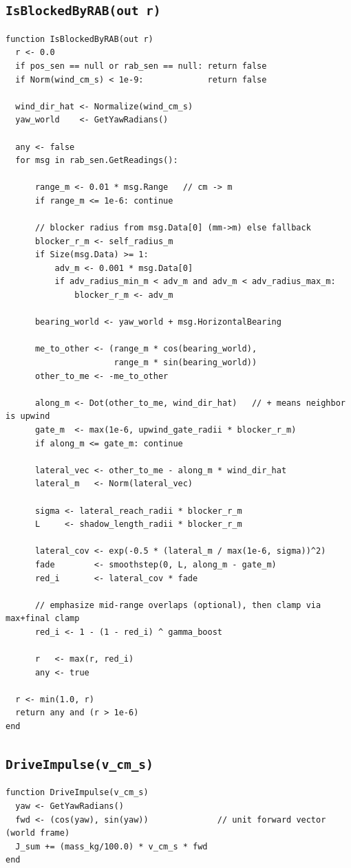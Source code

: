 \documentclass[11pt,a4paper]{article}
\begin{document}
\subsection{\texttt{IsBlockedByRAB(out r)}}
\begin{lstlisting}[language=pseudo]
function IsBlockedByRAB(out r)
  r <- 0.0
  if pos_sen == null or rab_sen == null: return false
  if Norm(wind_cm_s) < 1e-9:             return false

  wind_dir_hat <- Normalize(wind_cm_s)
  yaw_world    <- GetYawRadians()

  any <- false
  for msg in rab_sen.GetReadings():

      range_m <- 0.01 * msg.Range   // cm -> m
      if range_m <= 1e-6: continue

      // blocker radius from msg.Data[0] (mm->m) else fallback
      blocker_r_m <- self_radius_m
      if Size(msg.Data) >= 1:
          adv_m <- 0.001 * msg.Data[0]
          if adv_radius_min_m < adv_m and adv_m < adv_radius_max_m:
              blocker_r_m <- adv_m

      bearing_world <- yaw_world + msg.HorizontalBearing

      me_to_other <- (range_m * cos(bearing_world),
                      range_m * sin(bearing_world))
      other_to_me <- -me_to_other

      along_m <- Dot(other_to_me, wind_dir_hat)   // + means neighbor is upwind
      gate_m  <- max(1e-6, upwind_gate_radii * blocker_r_m)
      if along_m <= gate_m: continue

      lateral_vec <- other_to_me - along_m * wind_dir_hat
      lateral_m   <- Norm(lateral_vec)

      sigma <- lateral_reach_radii * blocker_r_m
      L     <- shadow_length_radii * blocker_r_m

      lateral_cov <- exp(-0.5 * (lateral_m / max(1e-6, sigma))^2)
      fade        <- smoothstep(0, L, along_m - gate_m)
      red_i       <- lateral_cov * fade

      // emphasize mid-range overlaps (optional), then clamp via max+final clamp
      red_i <- 1 - (1 - red_i) ^ gamma_boost

      r   <- max(r, red_i)
      any <- true

  r <- min(1.0, r)
  return any and (r > 1e-6)
end
\end{lstlisting}

\subsection{\texttt{DriveImpulse(v\_cm\_s)}}
\begin{lstlisting}[language=pseudo]
function DriveImpulse(v_cm_s)
  yaw <- GetYawRadians()
  fwd <- (cos(yaw), sin(yaw))              // unit forward vector (world frame)
  J_sum += (mass_kg/100.0) * v_cm_s * fwd
end
\end{lstlisting}
\end{document}
